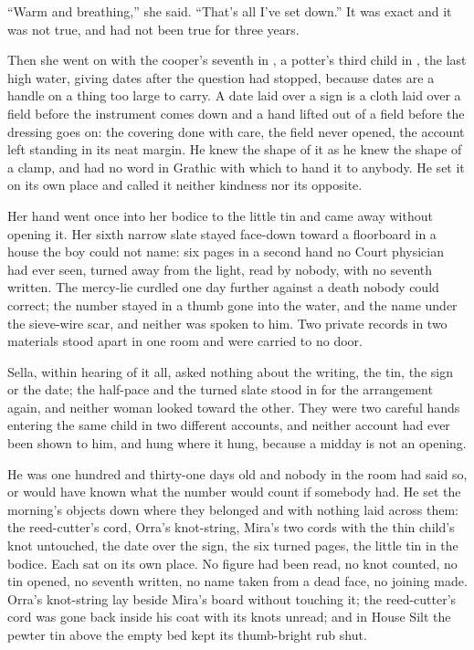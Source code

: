 “Warm and breathing,” she said. “That's all I've set down.” It was exact and it was not true, and had not been true for three years.

Then she went on with the cooper's seventh in , a potter's third child in , the last high water, giving dates after the question had stopped, because dates are a handle on a thing too large to carry. A date laid over a sign is a cloth laid over a field before the instrument comes down and a hand lifted out of a field before the dressing goes on: the covering done with care, the field never opened, the account left standing in its neat margin. He knew the shape of it as he knew the shape of a clamp, and had no word in Grathic with which to hand it to anybody. He set it on its own place and called it neither kindness nor its opposite.

Her hand went once into her bodice to the little tin and came away without opening it. Her sixth narrow slate stayed face-down toward a floorboard in a house the boy could not name: six pages in a second hand no Court physician had ever seen, turned away from the light, read by nobody, with no seventh written. The mercy-lie curdled one day further against a death nobody could correct; the number stayed in a thumb gone into the water, and the name under the sieve-wire scar, and neither was spoken to him. Two private records in two materials stood apart in one room and were carried to no door.

Sella, within hearing of it all, asked nothing about the writing, the tin, the sign or the date; the half-pace and the turned slate stood in for the arrangement again, and neither woman looked toward the other. They were two careful hands entering the same child in two different accounts, and neither account had ever been shown to him, and  hung where it hung, because a midday is not an opening.

He was one hundred and thirty-one days old and nobody in the room had said so, or would have known what the number would count if somebody had. He set the morning's objects down where they belonged and with nothing laid across them: the reed-cutter's cord, Orra's knot-string, Mira's two cords with the thin child's knot untouched, the date over the sign, the six turned pages, the little tin in the bodice. Each sat on its own place. No figure had been read, no knot counted, no tin opened, no seventh written, no name taken from a dead face, no joining made. Orra's knot-string lay beside Mira's board without touching it; the reed-cutter's cord was gone back inside his coat with its knots unread; and in House Silt the pewter tin above the empty bed kept its thumb-bright rub shut.

